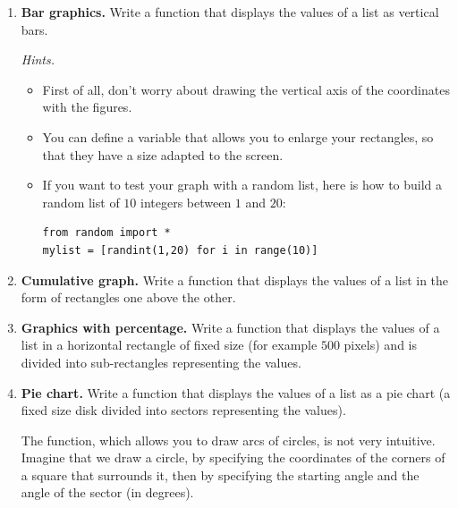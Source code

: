 \documentclass[11pt,class=report,crop=false]{standalone}
\begin{document}
\begin{activite}[Graphics]
\begin{enumerate}
  \item \textbf{Bar graphics.} Write a  function that displays the values of a list as vertical bars.
  


 \emph{Hints.}
  \begin{itemize}
    \item First of all, don't worry about drawing the vertical axis of the coordinates with the figures.
    \item You can define a variable  that allows you to enlarge your rectangles, so that they have a size adapted to the screen.
    \item If you want to test your graph with a random list, here is how to build a random list of $10$ integers between $1$ and $20$:
    
\begin{lstlisting}
from random import *
mylist = [randint(1,20) for i in range(10)]
\end{lstlisting}

\end{itemize}

  \item \textbf{Cumulative graph.} Write a  function that displays the values of a list in the form of rectangles one above the other.
  

  
  \item \textbf{Graphics with percentage.} Write a  function that displays the values of a list in a horizontal rectangle of fixed size (for example $500$ pixels) and is divided into sub-rectangles representing the values.
  


  \item \textbf{Pie chart.} Write a  function that displays the values of a list as a pie chart (a fixed size disk divided into sectors representing the values). 
 
The   function, which allows you to draw arcs of circles, is not very intuitive. Imagine that we draw a circle, by specifying the coordinates of the corners of a square that surrounds it, then by specifying the starting angle and the angle of the sector (in degrees). 




\end{enumerate}
\end{activite}
\end{document}

